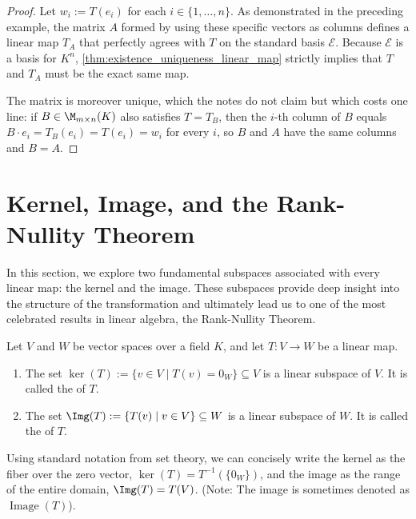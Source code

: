 \begin{proof}
Let $w_i := T(e_i)$ for each $i \in \{1, \dots, n\}$. As demonstrated in the preceding example, the matrix $A$ formed by using these specific vectors as columns defines a linear map $T_A$ that perfectly agrees with $T$ on the standard basis $\mathcal{E}$. Because $\mathcal{E}$ is a basis for $K^n$, \cref{thm:existence_uniqueness_linear_map} strictly implies that $T$ and $T_A$ must be the exact same map.

The matrix is moreover unique, which the notes do not claim but which costs one line: if $B \in \M_{m \times n}(K)$ also satisfies $T = T_B$, then the $i$-th column of $B$ equals $B \cdot e_i = T_B(e_i) = T(e_i) = w_i$ for every $i$, so $B$ and $A$ have the same columns and $B = A$.
\end{proof}
\renewcommand{\thetheorem}{15.b.\arabic{theorem}}
\setcounter{theorem}{0}
\section{Kernel, Image, and the Rank-Nullity Theorem}
\label{sec:kernel_image_rank}

In this section, we explore two fundamental subspaces associated with every linear map: the kernel and the image. These subspaces provide deep insight into the structure of the transformation and ultimately lead us to one of the most celebrated results in linear algebra, the Rank-Nullity Theorem.

\begin{proposition}
\label{prop:kernel_image}
Let $V$ and $W$ be vector spaces over a field $K$, and let $T: V \to W$ be a linear map.
\begin{enumerate}[label=\textbf{(\alph*)}]
    \item The set $\ker(T) := \{v \in V \mid T(v) = 0_W\} \subseteq V$ is a linear subspace of $V$. It is called the  of $T$.
    \item The set $\Img(T) := \{T(v) \mid v \in V\} \subseteq W$ is a linear subspace of $W$. It is called the  of $T$.
\end{enumerate}
\end{proposition}

\begin{remark}
\label{rem:set_theoretic_notation}
Using standard notation from set theory, we can concisely write the kernel as the fiber over the zero vector, $\ker(T) = T^{-1}(\{0_W\})$, and the image as the range of the entire domain, $\Img(T) = T(V)$. (Note: The image is sometimes denoted as $\operatorname{Image}(T)$).
\end{remark}

